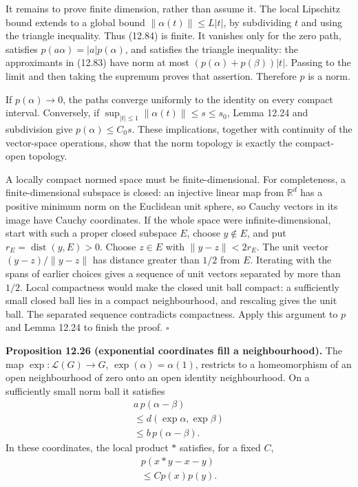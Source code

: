 \documentclass[
  11pt,
]{article}
\begin{document}
It remains to prove finite dimension, rather than assume it. The local
Lipschitz bound extends to a global bound \(\|\alpha(t)\|\leq L|t|\), by
subdividing \(t\) and using the triangle inequality. Thus (12.84) is
finite. It vanishes only for the zero path, satisfies
\(p(a\alpha)=|a|p(\alpha)\), and satisfies the triangle inequality: the
approximants in (12.83) have norm at most \((p(\alpha)+p(\beta))|t|\).
Passing to the limit and then taking the supremum proves that assertion.
Therefore \(p\) is a norm.

If \(p(\alpha)\to0\), the paths converge uniformly to the identity on
every compact interval. Conversely, if
\(\sup_{|t|\leq1}\|\alpha(t)\|\leq s\leq s_0\), Lemma 12.24 and
subdivision give \(p(\alpha)\leq C_0s\). These implications, together
with continuity of the vector-space operations, show that the norm
topology is exactly the compact-open topology.

A locally compact normed space must be finite-dimensional. For
completeness, a finite-dimensional subspace is closed: an injective
linear map from \(\mathbb R^d\) has a positive minimum norm on the
Euclidean unit sphere, so Cauchy vectors in its image have Cauchy
coordinates. If the whole space were infinite-dimensional, start with
such a proper closed subspace \(E\), choose \(y\notin E\), and put
\(r_E=\operatorname{dist}(y,E)>0\). Choose \(z\in E\) with
\(\|y-z\|<2r_E\). The unit vector \((y-z)/\|y-z\|\) has distance greater
than \(1/2\) from \(E\). Iterating with the spans of earlier choices
gives a sequence of unit vectors separated by more than \(1/2\). Local
compactness would make the closed unit ball compact: a sufficiently
small closed ball lies in a compact neighbourhood, and rescaling gives
the unit ball. The separated sequence contradicts compactness. Apply
this argument to \(p\) and Lemma 12.24 to finish the proof. \(\square\)

\textbf{Proposition 12.26 (exponential coordinates fill a
neighbourhood).} The map \(\exp:\mathcal L(G)\to G\),
\(\exp(\alpha)=\alpha(1)\), restricts to a homeomorphism of an open
neighbourhood of zero onto an open identity neighbourhood. On a
sufficiently small norm ball it satisfies \[
\begin{gathered}
a\,p(\alpha-\beta)\\
\leq d(\exp\alpha,\exp\beta)\\
\leq b\,p(\alpha-\beta).
\end{gathered}
\tag{12.88}
\] In these coordinates, the local product \(*\) satisfies, for a fixed
\(C\), \[
\begin{gathered}
p(x*y-x-y)\\
\leq C p(x)p(y).
\end{gathered}
\tag{12.89}
\]
\end{document}
